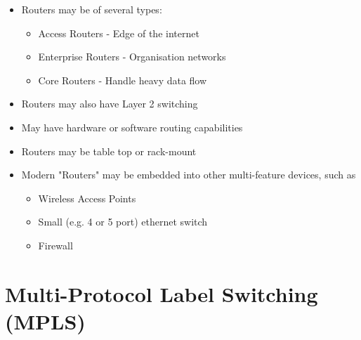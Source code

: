 \begin{itemize}
  \item Routers may be of several types:
  \begin{itemize}
    \item Access Routers - Edge of the internet
    \item Enterprise Routers - Organisation networks
    \item Core Routers - Handle heavy data flow
  \end{itemize}
  \item Routers may also have Layer 2 switching
  \item May have hardware or software routing capabilities
  \item Routers may be table top or rack-mount
  \item Modern "Routers" may be embedded into other multi-feature devices, such as
  \begin{itemize}
    \item Wireless Access Points
    \item Small (e.g. 4 or 5 port) ethernet switch
    \item Firewall
  \end{itemize}
\end{itemize}

\section*{Multi-Protocol Label Switching (MPLS)}

